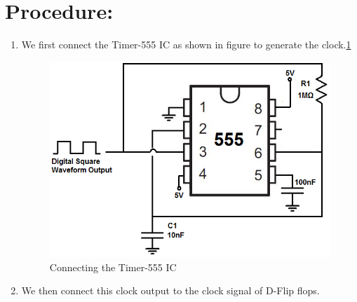 \documentclass[journal,12pt,twocolumn]{IEEEtran}
\begin{document}
\section*{Procedure:}
\begin{enumerate}
    \item We first connect the Timer-555 IC as shown in figure to generate the clock.\ref{555}
    \begin{figure}[h]
		\includegraphics[width=\columnwidth]{figs/555.png}
		\caption{Connecting the Timer-555 IC}
		\label{555}
	\end{figure}

	\item We then connect this clock output to the clock signal of D-Flip flops.



\end{enumerate}
\end{document}

